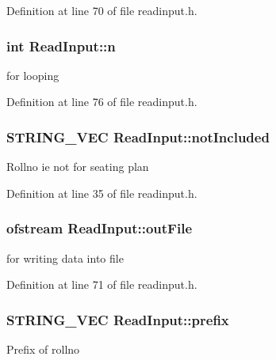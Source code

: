 \-Definition at line 70 of file readinput.\-h.

\hypertarget{classReadInput_a00428413f6f29154a5d1170c768bbe35}{
\subsubsection[{n}]{\setlength{\rightskip}{0pt plus 5cm}int {\bf \-Read\-Input\-::n}}}\label{classReadInput_a00428413f6f29154a5d1170c768bbe35}
for looping 

\-Definition at line 76 of file readinput.\-h.

\hypertarget{classReadInput_a4b4854ad4dd83b96d6c38d1f0b8d5417}{
\subsubsection[{not\-Included}]{\setlength{\rightskip}{0pt plus 5cm}\-S\-T\-R\-I\-N\-G\-\_\-\-V\-E\-C {\bf \-Read\-Input\-::not\-Included}}}\label{classReadInput_a4b4854ad4dd83b96d6c38d1f0b8d5417}
\-Rollno ie not for seating plan 

\-Definition at line 35 of file readinput.\-h.

\hypertarget{classReadInput_af50237ba8a8e8e4a9e4ccc7926215937}{
\subsubsection[{out\-File}]{\setlength{\rightskip}{0pt plus 5cm}ofstream {\bf \-Read\-Input\-::out\-File}}}\label{classReadInput_af50237ba8a8e8e4a9e4ccc7926215937}
for writing data into file 

\-Definition at line 71 of file readinput.\-h.

\hypertarget{classReadInput_a6a96c934f8c9a2a2056dc50505017e52}{
\subsubsection[{prefix}]{\setlength{\rightskip}{0pt plus 5cm}\-S\-T\-R\-I\-N\-G\-\_\-\-V\-E\-C {\bf \-Read\-Input\-::prefix}}}\label{classReadInput_a6a96c934f8c9a2a2056dc50505017e52}
\-Prefix of rollno 

